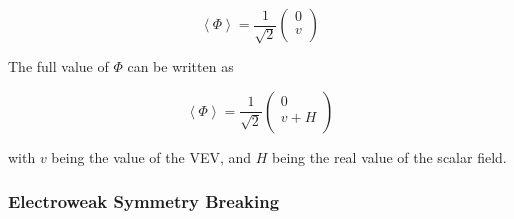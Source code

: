 \begin{equation}
  \label{eq:VEV}
  \left\langle\Phi\right\rangle = \frac{1}{\sqrt{2}}
  \begin{pmatrix}                                                                                                                               
    0 \\                                                                                                                                   
    v \\                                                                                                                                   
  \end{pmatrix}                                                                                                                       
\end{equation}

The full value of $\Phi$ can be written as 

\begin{equation}                                                                                                                                
  \label{eq:HandV}                                                                                                                                  \left\langle\Phi\right\rangle = \frac{1}{\sqrt{2}}                                                                     
  \begin{pmatrix}                                                                                                                               
    0 \\                                                                                                                   
    v + H\\                                               
  \end{pmatrix}                                                                                                                        
\end{equation}

with $v$ being the value of the VEV, and $H$ being the real value of the scalar field. 

\subsubsection{Electroweak Symmetry Breaking}
\label{sec:EWKbreaking}

